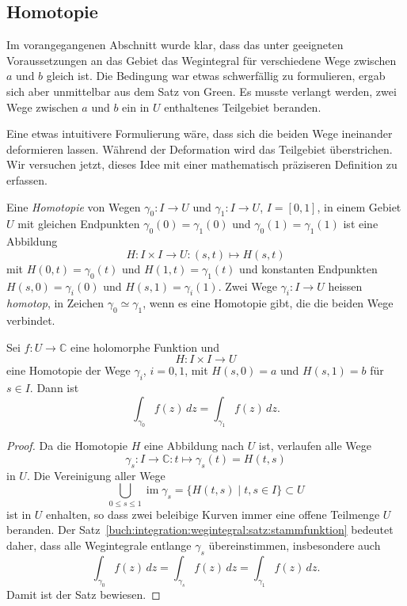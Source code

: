 %
%
%
\subsection{Homotopie
\label{buch:integration:wegintegral:subsection:homotopie}}
Im vorangegangenen Abschnitt wurde klar, dass das unter geeigneten
Voraussetzungen an das Gebiet das Wegintegral für verschiedene Wege 
zwischen $a$ und $b$ gleich ist.
Die Bedingung war etwas schwerfällig zu formulieren, ergab sich aber
unmittelbar aus dem Satz von Green.
Es musste verlangt werden, zwei Wege zwischen $a$ und $b$ ein in
$U$ enthaltenes Teilgebiet beranden.

Eine etwas intuitivere Formulierung wäre, dass sich die beiden
Wege ineinander deformieren lassen.
Während der Deformation wird das Teilgebiet überstrichen.
%
Wir versuchen jetzt, dieses Idee mit einer mathematisch präziseren
Definition zu erfassen.


\begin{definition}
\label{buch:integration:definition:homotpie}
Eine \emph{Homotopie} von Wegen $\gamma_0\colon I\to U$
%
und
$\gamma_1\colon I\to U$, $I=[0,1]$,
in einem Gebiet $U$
mit gleichen Endpunkten
$\gamma_0(0)=\gamma_1(0)$
und
$\gamma_0(1)=\gamma_1(1)$
ist eine Abbildung
\[
H
\colon
I\times I \to U
:
(s,t) \mapsto H(s,t)
\]
mit $H(0,t)=\gamma_0(t)$ und $H(1,t)=\gamma_1(t)$
und konstanten Endpunkten
$H(s,0)=\gamma_i(0)$
und
$H(s,1)=\gamma_i(1)$.
Zwei Wege $\gamma_i\colon I\to U$  heissen \emph{homotop}, in Zeichen
$\gamma_0\simeq \gamma_1$, wenn es eine
Homotopie gibt, die die beiden Wege verbindet.
\end{definition}

\begin{satz}
\label{buch:integration:satz:homotopie}
Sei $f\colon U\to\mathbb{C}$ eine holomorphe Funktion und
\[
H
\colon
I\times I
\to
U
\]
eine Homotopie der Wege $\gamma_i$, $i=0,1$, mit $H(s,0) = a$ und $H(s,1)=b$
für $s\in I$.
Dann ist
\[
\int_{\gamma_0} f(z)\,dz
=
\int_{\gamma_1} f(z)\,dz.
\]
\end{satz}

\begin{proof}
Da die Homotopie $H$ eine Abbildung nach $U$ ist, verlaufen
alle Wege
\[
\gamma_s
\colon
I\to\mathbb{C}
:
t
\mapsto
\gamma_s(t) = H(t,s)
\]
in $U$.
Die Vereinigung aller Wege
\[
\bigcup_{0\le s\le 1} \operatorname{im}\gamma_s
=
\{
H(t,s)
\mid
t,s\in I
\}
\subset U
\]
ist in $U$ enhalten, so dass zwei beleibige Kurven immer eine
offene Teilmenge $U$ beranden.
Der Satz~\ref{buch:integration:wegintegral:satz:stammfunktion}
bedeutet daher, dass alle Wegintegrale entlange $\gamma_s$
übereinstimmen, insbesondere auch
\[
\int_{\gamma_0} f(z) \, dz
=
\int_{\gamma_s} f(z) \, dz
= 
\int_{\gamma_1} f(z) \, dz.
\]
Damit ist der Satz bewiesen.
\end{proof}

